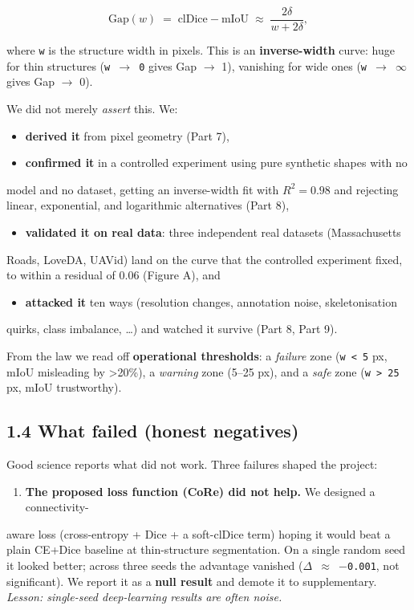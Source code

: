 \documentclass[11pt]{article}
\begin{document}
\[\text{Gap}(w) \;=\; \text{clDice} - \text{mIoU} \;\approx\; \frac{2\delta}{w + 2\delta},\]

where \texttt{w} is the structure width in pixels. This is an \textbf{inverse-width} curve: huge for thin structures (\texttt{w $\rightarrow$ 0} gives Gap $\rightarrow$ 1), vanishing for wide ones (\texttt{w $\rightarrow$ $\infty$} gives Gap $\rightarrow$ 0).

We did not merely \textit{assert} this. We:

\begin{itemize}\setlength{\itemsep}{1pt}
\item \textbf{derived it} from pixel geometry (Part 7),
\item \textbf{confirmed it} in a controlled experiment using pure synthetic shapes with no
\end{itemize}
  model and no dataset, getting an inverse-width fit with \(R^2 = 0.98\) and rejecting   linear, exponential, and logarithmic alternatives (Part 8),
\begin{itemize}\setlength{\itemsep}{1pt}
\item \textbf{validated it on real data}: three independent real datasets (Massachusetts
\end{itemize}
  Roads, LoveDA, UAVid) land on the curve that the controlled experiment fixed, to   within a residual of 0.06 (Figure A), and
\begin{itemize}\setlength{\itemsep}{1pt}
\item \textbf{attacked it} ten ways (resolution changes, annotation noise, skeletonisation
\end{itemize}
  quirks, class imbalance, \ldots{}) and watched it survive (Part 8, Part 9).

From the law we read off \textbf{operational thresholds}: a \textit{failure} zone (\texttt{w < 5} px, mIoU misleading by >20\%), a \textit{warning} zone (5--25 px), and a \textit{safe} zone (\texttt{w > 25} px, mIoU trustworthy).

\subsection*{1.4 What failed (honest negatives)}

Good science reports what did not work. Three failures shaped the project:

\begin{enumerate}\setlength{\itemsep}{1pt}
\item \textbf{The proposed loss function (CoRe) did not help.} We designed a connectivity-
\end{enumerate}
   aware loss (cross-entropy + Dice + a soft-clDice term) hoping it would beat a    plain CE+Dice baseline at thin-structure segmentation. On a single random seed it    looked better; across three seeds the advantage vanished (\texttt{$\Delta$ $\approx$ $-$0.001}, not    significant). We report it as a \textbf{null result} and demote it to supplementary.    \textit{Lesson: single-seed deep-learning results are often noise.}
\end{document}
